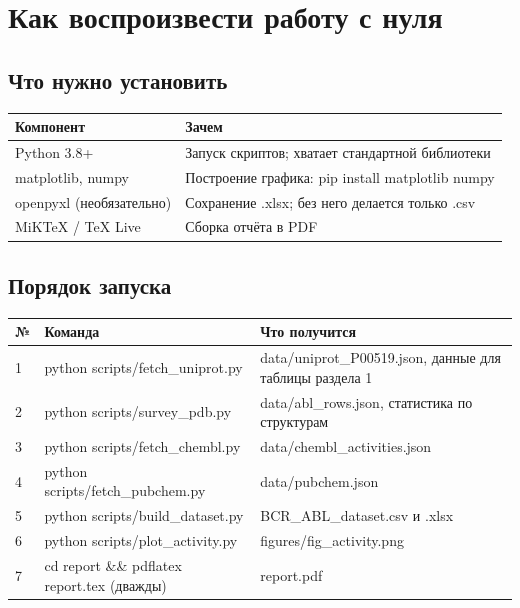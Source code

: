 \documentclass[11pt,a4paper]{article}
\newcommand{\code}[1]{{\ttfamily #1}}
\begin{document}
\section{Как воспроизвести работу с нуля}

\subsection{Что нужно установить}

\begin{center}
\small
\begin{tabular}{L{4.6cm}L{10.0cm}}
\toprule
\textbf{Компонент} & \textbf{Зачем} \\
\midrule
Python 3.8+ & Запуск скриптов; хватает стандартной библиотеки \\
\code{matplotlib}, \code{numpy} & Построение графика: \code{pip install matplotlib numpy} \\
\code{openpyxl} (необязательно) & Сохранение .xlsx; без него делается только .csv \\
MiKTeX / TeX Live & Сборка отчёта в PDF \\
\bottomrule
\end{tabular}
\end{center}

\subsection{Порядок запуска}

\begin{center}
\small
\begin{tabular}{L{1.0cm}L{5.4cm}L{7.8cm}}
\toprule
\textbf{№} & \textbf{Команда} & \textbf{Что получится} \\
 & \code{python scripts/fetch\_uniprot.py} & \code{data/uniprot\_P00519.json}, данные для таблицы раздела 1 \\
2 & \code{python scripts/survey\_pdb.py} & \code{data/abl\_rows.json}, статистика по структурам \\
3 & \code{python scripts/fetch\_chembl.py} & \code{data/chembl\_activities.json} \\
4 & \code{python scripts/fetch\_pubchem.py} & \code{data/pubchem.json} \\
5 & \code{python scripts/build\_dataset.py} & \code{BCR\_ABL\_dataset.csv} и \code{.xlsx} \\
6 & \code{python scripts/plot\_activity.py} & \code{figures/fig\_activity.png} \\
7 & \code{cd report \&\& pdflatex report.tex} (дважды) & \code{report.pdf} \\
\bottomrule
\end{tabular}
\end{center}
\end{document}
